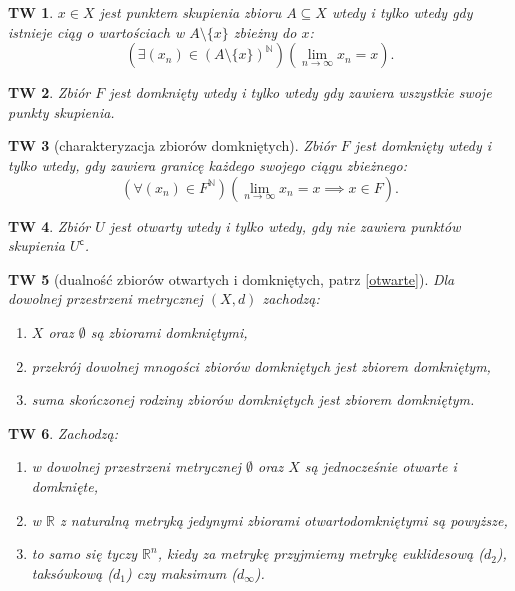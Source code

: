 \documentclass[a4paper, 12pt]{mwart}
\newcommand{\cc}{\mathsf{c}}
\theoremstyle{definition}
\theoremstyle{plain}
\newtheorem{twierdzenie}{TW}[section]
\theoremstyle{remark}
\begin{document}
\begin{twierdzenie}
	$x \in X$ jest punktem skupienia zbioru $A \subseteq X$ wtedy i tylko wtedy gdy istnieje ciąg o wartościach w $A \setminus\{x\}$ zbieżny do $x$:
	\begin{equation}
		\left(\exists (x_n) \in {\left(A \setminus \{x\}\right)}^\mathbb{N}\right)\left( \lim_{n \to \infty} x_n = x\right).
	\end{equation}
\end{twierdzenie}
\begin{twierdzenie}
	Zbiór $F$ jest domknięty wtedy i tylko wtedy gdy zawiera wszystkie swoje punkty skupienia.
\end{twierdzenie}
\begin{twierdzenie}[charakteryzacja zbiorów domkniętych]
	Zbiór $F$ jest domknięty wtedy i tylko wtedy, gdy zawiera granicę każdego swojego ciągu zbieżnego:
	\begin{equation}
		\left(\forall (x_n) \in F^\mathbb{N}\right)\left(\lim_{n \to \infty} x_n = x \implies x \in F\right).
	\end{equation}
\end{twierdzenie}
\begin{twierdzenie}
	Zbiór $U$ jest otwarty wtedy i tylko wtedy, gdy nie zawiera punktów skupienia $U^\cc$.
\end{twierdzenie}
\begin{twierdzenie}[dualność zbiorów otwartych i domkniętych, patrz \ref{otwarte}]
	Dla dowolnej przestrzeni metrycznej $(X, d)$ zachodzą:
	\begin{enumerate}
		\item $X$ oraz $\emptyset$ są zbiorami domkniętymi,
		\item przekrój dowolnej mnogości zbiorów domkniętych jest zbiorem domkniętym,
		\item suma skończonej rodziny zbiorów domkniętych jest zbiorem domkniętym.
	\end{enumerate}
\end{twierdzenie}
\begin{twierdzenie}
	Zachodzą:
	\begin{enumerate}
		\item w dowolnej przestrzeni metrycznej $\emptyset$ oraz $X$ są jednocześnie otwarte i domknięte,
		\item w $\mathbb{R}$ z naturalną metryką jedynymi zbiorami otwarto\dywiz domkniętymi są powyższe,
		\item to samo się tyczy $\mathbb{R}^n$, kiedy za metrykę przyjmiemy metrykę euklidesową ($d_2$), taksówkową ($d_1$) czy maksimum ($d_\infty$).
	\end{enumerate}
\end{twierdzenie}
\end{document}

